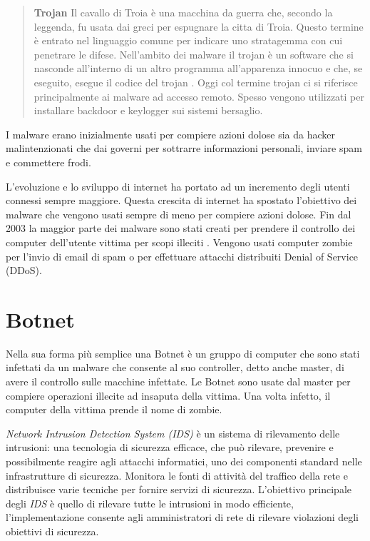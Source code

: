 \documentclass[../main.tex]{subfiles}
\begin{document}
\begin{verse}
				\textbf{Trojan} Il cavallo di Troia è una macchina da guerra che, secondo la leggenda, fu usata dai greci per espugnare la citta di Troia. Questo termine è entrato nel linguaggio comune per indicare uno stratagemma con cui penetrare le difese. Nell'ambito dei malware il trojan è un software che si nasconde all'interno di un altro programma all'apparenza innocuo e che, se eseguito, esegue il codice del trojan \cite{TrojanDef}.
				Oggi col termine trojan ci si riferisce principalmente ai malware ad accesso remoto. Spesso vengono utilizzati per installare backdoor e keylogger sui sistemi bersaglio. \cite{TrojanPurpose}
\end{verse}

I malware erano inizialmente usati per compiere azioni dolose sia da hacker malintenzionati che dai governi per sottrarre informazioni personali, inviare spam e commettere frodi. \cite{ScopoMalware} \cite{MalwareRevolution}

L'evoluzione e lo sviluppo di internet ha portato ad un incremento degli utenti connessi sempre maggiore. Questa crescita di internet ha spostato l'obiettivo dei malware che vengono usati sempre di meno per compiere azioni dolose. Fin dal 2003 la maggior parte dei malware sono stati creati per prendere il controllo dei computer dell'utente vittima per scopi illeciti \cite{MalwareRevolution}. Vengono usati computer zombie per l'invio di email di spam o per effettuare attacchi distribuiti Denial of Service (DDoS).


\section{Botnet}
Nella sua forma più semplice una Botnet è un gruppo di computer che sono stati infettati da un malware che consente al suo controller, detto anche master, di avere il controllo sulle macchine infettate. Le Botnet sono usate dal master per compiere operazioni illecite ad insaputa della vittima. Una volta infetto, il computer della vittima prende il nome di zombie. \cite{Botnet}

\textit{Network Intrusion Detection System (IDS)} è un sistema di rilevamento delle intrusioni: una tecnologia di sicurezza efficace, che può rilevare, prevenire e possibilmente reagire agli attacchi informatici, uno dei componenti standard nelle infrastrutture di sicurezza. Monitora le fonti di attività del traffico della rete e distribuisce varie tecniche per fornire servizi di sicurezza. L'obiettivo principale degli \textit{IDS} è quello di rilevare tutte le intrusioni in modo efficiente, l'implementazione consente agli amministratori di rete di rilevare violazioni degli obiettivi di sicurezza.
\end{document}
